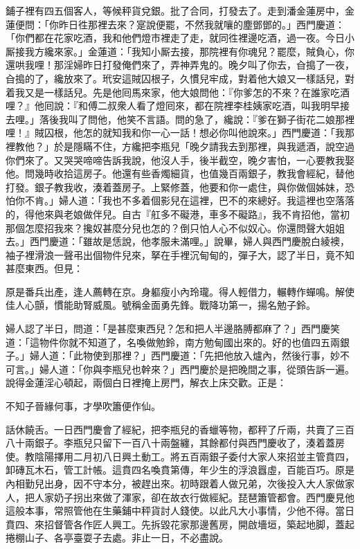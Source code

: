 鋪子裡有四五個客人，等候秤貨兌銀。批了合同，打發去了。走到潘金蓮房中，金蓮便問：「你昨日徃那裡去來？寔說便罷，不然我就嚷的塵鄧鄧的。」西門慶道：「你們都在花家吃酒，我和他們燈市裡走了走，就同徃裡邊吃酒，過一夜。今日小厮接我方纔來家。」金蓮道：「我知小厮去接，那院裡有你魂兒？罷麼，賊負心，你還哄我哩！那淫婦昨日打發俺們來了，弄神弄鬼的。晚夕叫了你去，㒲搗了一夜，㒲搗的了，纔放來了。{}玳安這賊囚根子，久慣兒牢成，對着他大娘又一樣話兒，對着我又是一樣話兒。先是他囘馬來家，他大娘問他：『你爹怎的不來？在誰家吃酒哩？』他囘說：『和傅二叔衆人看了燈囘來，都在院裡李桂姨家吃酒，叫我明早接去哩。」落後我叫了問他，他笑不言語。問的急了，{}纔說：『爹在獅子街花二娘那裡哩！』賊囚根，他怎的就知我和你一心一話！想必你叫他說來。」西門慶道：「我那裡教他？」於是隱瞞不住，方纔把李瓶兒「晚夕請我去到那裡，與我遞酒，說空過你們來了。又哭哭啼啼告訴我說，他沒人手，後半截空，晚夕害怕，一心要教我娶他。問幾時收拾這房子。他還有些香燭細貨，也值幾百兩銀子，教我會經紀，替他打發。銀子教我收，湊着蓋房子。上緊修蓋，他要和你一處住，與你做個姊妹，恐怕你不肯。」{}婦人道：「我也不多着個影兒在這裡，巴不的來總好。我這裡也空落落的，得他來與老娘做伴兒。自古『舡多不礙港，車多不礙路』，我不肯招他，當初那個怎麼招我來？攙奴甚麼分兒也怎的？倒只怕人心不似奴心。{}{}你還問聲大姐姐去。」西門慶道：「雖故是恁說，他孝服未滿哩。」說畢，婦人與西門慶脫白綾襖，袖子裡滑浪一聲弔出個物件兒來，{}拏在手裡沉甸甸的，彈子大，認了半日，竟不知甚麼東西。但見：

原是番兵出產，逢人薦轉在京。身軀瘦小內玲瓏。得人輕借力，輾轉作蟬鳴。解使佳人心顫，慣能助腎威風。號稱金面勇先鋒。戰降功第一，揚名勉子鈴。

婦人認了半日，問道：「是甚麼東西兒？怎和把人半邊胳膊都麻了？」{}西門慶笑道：「這物件你就不知道了，名喚做勉鈴，南方勉甸國出來的。好的也值四五兩銀子。」婦人道：「此物使到那裡？」西門慶道：「先把他放入爐內，然後行事，妙不可言。」婦人道：「你與李瓶兒也幹來？」{}西門慶於是把晚間之事，從頭告訴一遍。說得金蓮淫心頓起，兩個白日裡掩上房門，解衣上床交歡。正是：

不知子晉緣何事，才學吹簫便作仙。

話休饒舌。一日西門慶會了經紀，把李瓶兒的香蠟等物，都秤了斤兩，共賣了三百八十兩銀子。李瓶兒只留下一百八十兩盤纏，其餘都付與西門慶收了，湊着蓋房使。教陰陽擇用二月初八日興土動工。將五百兩銀子委付大家人來招並主管賁四，卸磚瓦木石，管工計帳。這賁四名喚賁第傳，年少生的浮浪囂虛，百能百巧。原是內相勤兒出身，因不守本分，被趕出來。初時跟着人做兄弟，次後投入大人家做家人，把人家奶子拐出來做了渾家，{}卻在故衣行做經紀。琵琶簫管都會。西門慶見他這般本事，常照管他在生藥鋪中秤貨討人錢使。以此凡大小事情，少他不得。當日賁四、來招督管各作匠人興工。先拆毀花家那邊舊房，開啟墻垣，築起地脚，蓋起捲棚山子、各亭臺耍子去處。非止一日，不必盡說。

